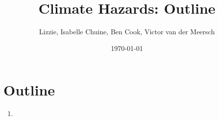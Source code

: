 \documentclass[11pt,letter]{article}
\begin{document}

\renewcommand{\refname}{\CHead{}}

\title{Climate Hazards: Outline}
\author{Lizzie, Isabelle Chuine, Ben Cook, Victor van der Meersch}
\date{\today}
\maketitle

\section{Outline}


\begin{enumerate}
\item
\end{enumerate}
\end{document}
